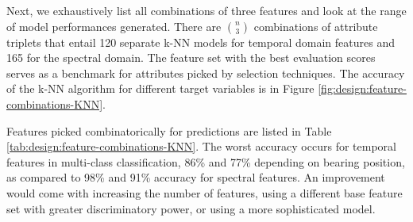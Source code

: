 Next, we exhaustively list all combinations of three features and look at the range of model performances generated. There are $\binom{n}{3}$ combinations of attribute triplets that entail 120 separate k-NN models for temporal domain features and 165 for the spectral domain. The feature set with the best evaluation scores serves as a benchmark for attributes picked by selection techniques. The accuracy of the k-NN algorithm for different target variables is in Figure \ref{fig:design:feature-combinations-KNN}. 



Features picked combinatorically for predictions are listed in Table \ref{tab:design:feature-combinations-KNN}. The worst accuracy occurs for temporal features in multi-class classification, 86\% and 77\% depending on bearing position, as compared to 98\% and 91\% accuracy for spectral features. An improvement would come with increasing the number of features, using a different base feature set with greater discriminatory power, or using a more sophisticated model.

